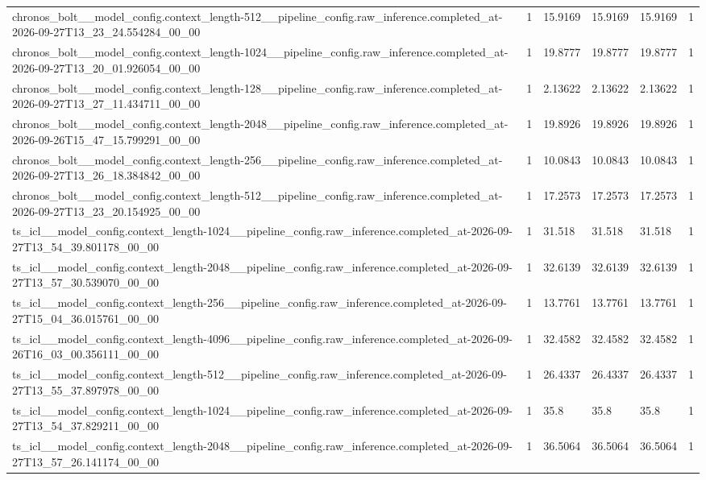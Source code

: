 \begin{tabular}{llllll}
chronos\_bolt\_\_model\_config.context\_length-512\_\_pipeline\_config.raw\_inference.completed\_at-2026-09-27T13\_23\_24.554284\_00\_00 & 1 & 15.9169 & 15.9169 & 15.9169 & 1 \\
chronos\_bolt\_\_model\_config.context\_length-1024\_\_pipeline\_config.raw\_inference.completed\_at-2026-09-27T13\_20\_01.926054\_00\_00 & 1 & 19.8777 & 19.8777 & 19.8777 & 1 \\
chronos\_bolt\_\_model\_config.context\_length-128\_\_pipeline\_config.raw\_inference.completed\_at-2026-09-27T13\_27\_11.434711\_00\_00 & 1 & 2.13622 & 2.13622 & 2.13622 & 1 \\
chronos\_bolt\_\_model\_config.context\_length-2048\_\_pipeline\_config.raw\_inference.completed\_at-2026-09-26T15\_47\_15.799291\_00\_00 & 1 & 19.8926 & 19.8926 & 19.8926 & 1 \\
chronos\_bolt\_\_model\_config.context\_length-256\_\_pipeline\_config.raw\_inference.completed\_at-2026-09-27T13\_26\_18.384842\_00\_00 & 1 & 10.0843 & 10.0843 & 10.0843 & 1 \\
chronos\_bolt\_\_model\_config.context\_length-512\_\_pipeline\_config.raw\_inference.completed\_at-2026-09-27T13\_23\_20.154925\_00\_00 & 1 & 17.2573 & 17.2573 & 17.2573 & 1 \\
ts\_icl\_\_model\_config.context\_length-1024\_\_pipeline\_config.raw\_inference.completed\_at-2026-09-27T13\_54\_39.801178\_00\_00 & 1 & 31.518 & 31.518 & 31.518 & 1 \\
ts\_icl\_\_model\_config.context\_length-2048\_\_pipeline\_config.raw\_inference.completed\_at-2026-09-27T13\_57\_30.539070\_00\_00 & 1 & 32.6139 & 32.6139 & 32.6139 & 1 \\
ts\_icl\_\_model\_config.context\_length-256\_\_pipeline\_config.raw\_inference.completed\_at-2026-09-27T15\_04\_36.015761\_00\_00 & 1 & 13.7761 & 13.7761 & 13.7761 & 1 \\
ts\_icl\_\_model\_config.context\_length-4096\_\_pipeline\_config.raw\_inference.completed\_at-2026-09-26T16\_03\_00.356111\_00\_00 & 1 & 32.4582 & 32.4582 & 32.4582 & 1 \\
ts\_icl\_\_model\_config.context\_length-512\_\_pipeline\_config.raw\_inference.completed\_at-2026-09-27T13\_55\_37.897978\_00\_00 & 1 & 26.4337 & 26.4337 & 26.4337 & 1 \\
ts\_icl\_\_model\_config.context\_length-1024\_\_pipeline\_config.raw\_inference.completed\_at-2026-09-27T13\_54\_37.829211\_00\_00 & 1 & 35.8 & 35.8 & 35.8 & 1 \\
ts\_icl\_\_model\_config.context\_length-2048\_\_pipeline\_config.raw\_inference.completed\_at-2026-09-27T13\_57\_26.141174\_00\_00 & 1 & 36.5064 & 36.5064 & 36.5064 & 1 \\

\end{tabular}
